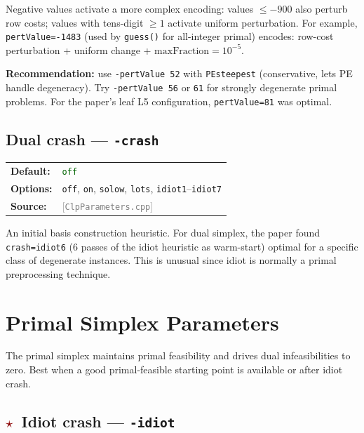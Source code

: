 \documentclass[11pt,a4paper]{article}
\newcommand{\param}[1]{\texttt{\textbf{#1}}}
\newcommand{\val}[1]{\texttt{#1}}
\newcommand{\src}[1]{\textcolor{gray}{\small[\texttt{#1}]}}
\newcommand{\default}[1]{\textcolor{darkgreen}{\texttt{#1}}}
\newcommand{\important}{\textcolor{darkred}{\textbf{$\star$}}}
\begin{document}
Negative values activate a more complex encoding: values $\le -900$ also perturb
row costs; values with tens-digit $\ge 1$ activate uniform perturbation.
For example, \val{pertValue=-1483} (used by \texttt{guess()} for all-integer primal)
encodes: row-cost perturbation + uniform change + $\text{maxFraction} = 10^{-5}$.

\begin{tipbox}
  \textbf{Recommendation:} use \val{-pertValue 52} with \val{PEsteepest}
  (conservative, lets PE handle degeneracy). Try \val{-pertValue 56} or \val{61}
  for strongly degenerate primal problems. For the paper's leaf L5 configuration,
  \val{pertValue=81} was optimal.
\end{tipbox}

\subsection{Dual crash --- \param{-crash}}

\begin{tabular}{@{}ll@{}}
  \textbf{Default:} & \default{off} \\
  \textbf{Options:} & \val{off}, \val{on}, \val{solow}, \val{lots}, \val{idiot1}--\val{idiot7} \\
  \textbf{Source:}  & \src{ClpParameters.cpp}
\end{tabular}

\medskip
An initial basis construction heuristic. For dual simplex, the paper found
\val{crash=idiot6} (6 passes of the idiot heuristic as warm-start) optimal
for a specific class of degenerate instances. This is unusual since idiot is
normally a primal preprocessing technique.

\section{Primal Simplex Parameters}
\label{sec:primal}

The primal simplex maintains primal feasibility and drives dual infeasibilities
to zero. Best when a good primal-feasible starting point is available or after
idiot crash.

\subsection{\important\ Idiot crash --- \param{-idiot}}
\end{document}
